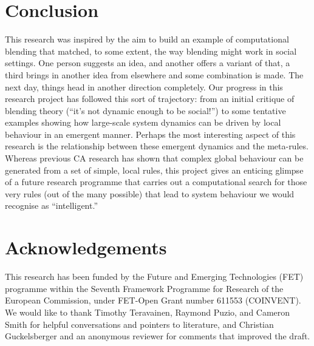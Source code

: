 \documentclass{AISB2008}
\begin{document}
\section{Conclusion}

This research was inspired by the aim to build an example of
computational blending that matched, to some extent, the way blending
might work in social settings.  One person suggests an idea, and
another offers a variant of that, a third brings in another idea from
elsewhere and some combination is made.  The next day, things head in
another direction completely.  Our progress in this research project
has followed this sort of trajectory: from an initial critique of
blending theory (``it's not dynamic enough to be social!'') to some
tentative examples showing how large-scale system dynamics can be
driven by local behaviour in an emergent manner.  Perhaps the most
interesting aspect of this research is the relationship between these
emergent dynamics and the meta-rules.  Whereas previous CA research
has shown that complex global behaviour can be generated from a set of
simple, local rules, this project gives an enticing glimpse of a
future research programme that carries out a computational search for
those very rules (out of the many possible) that lead to system
behaviour we would recognise as ``intelligent.''

\section{Acknowledgements}

This research has been funded by the Future and Emerging Technologies
(FET) programme within the Seventh Framework Programme for Research of
the European Commission, under FET-Open Grant number 611553
(COINVENT).
%
We would like to thank Timothy Teravainen, Raymond Puzio, and Cameron Smith for
helpful conversations and pointers to literature, and Christian
Guckelsberger and an anonymous reviewer for comments that improved the
draft.


\end{document}
